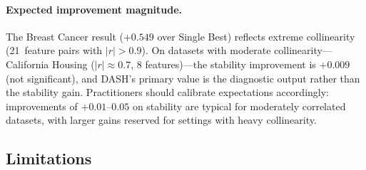 \documentclass[11pt]{article}
\newcommand{\dash}{\textsc{DASH}}
\begin{document}
\paragraph{Expected improvement magnitude.}
The Breast Cancer result ($+0.549$ over Single Best) reflects extreme
collinearity (21~feature pairs with $|r| > 0.9$). On datasets with
moderate collinearity---California Housing ($|r| \approx 0.7$, 8
features)---the stability improvement is $+0.009$ (not significant),
and \dash{}'s primary value is the diagnostic output rather than the
stability gain. Practitioners should calibrate expectations
accordingly: improvements of $+0.01$--$0.05$ on stability are typical
for moderately correlated datasets, with larger gains reserved for
settings with heavy collinearity.

\subsection{Limitations}
\end{document}

